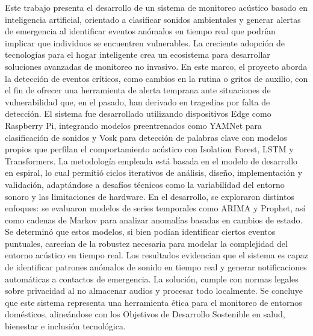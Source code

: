 Este trabajo presenta el desarrollo de un sistema de monitoreo acústico basado en inteligencia artificial, orientado a clasificar sonidos ambientales y generar alertas de emergencia al identificar eventos anómalos en tiempo real que podrían implicar que individuos se encuentren vulnerables. La creciente adopción de tecnologías para el hogar inteligente crea un ecosistema para desarrollar soluciones avanzadas de monitoreo no invasivo. En este marco, el proyecto aborda la detección de eventos críticos, como cambios en la rutina o gritos de auxilio, con el fin de ofrecer una herramienta de alerta temprana ante situaciones de vulnerabilidad que, en el pasado, han derivado en tragedias por falta de detección. El sistema fue desarrollado utilizando dispositivos Edge como Raspberry Pi, integrando modelos preentrenados como YAMNet para clasificación de sonidos y Vosk para detección de palabras clave con modelos propios que perfilan el comportamiento acústico con Isolation Forest, LSTM y Transformers. La metodología empleada está basada en el modelo de desarrollo en espiral, lo cual permitió ciclos iterativos de análisis, diseño, implementación y validación, adaptándose a desafíos técnicos como la variabilidad del entorno sonoro y las limitaciones de hardware. En el desarrollo, se exploraron distintos enfoques: se evaluaron modelos de series temporales como ARIMA y Prophet, así como cadenas de Markov para analizar anomalías basadas en cambios de estado. Se determinó que estos modelos, si bien podían identificar ciertos eventos puntuales, carecían de la robustez necesaria para modelar la complejidad del entorno acústico en tiempo real. Los resultados evidencian que el sistema es capaz de identificar patrones anómalos de sonido en tiempo real y generar notificaciones automáticas a contactos de emergencia. La solución, cumple con normas legales sobre privacidad al no almacenar audios y procesar todo localmente. Se concluye que este sistema representa una herramienta ética para el monitoreo de entornos domésticos, alineándose con los Objetivos de Desarrollo Sostenible en salud, bienestar e inclusión tecnológica.


